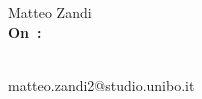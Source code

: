 \pagestyle{empty}
{\raggedleft\vspace*{\baselineskip}
{\LARGE Matteo Zandi}\\[0.35\textheight]
{\HUGE \textcolor{mycolor}{\textbf{On~\thetitle:}}}\\[\baselineskip]
{\LARGE \subt }\\[\baselineskip]
{\large \thedate}\par
\vspace*{2\baselineskip}
\vfill
{\large matteo.zandi2@studio.unibo.it}\par
\vspace*{\baselineskip}}
\clearpage
\pagestyle{headings}

\blankpage